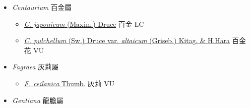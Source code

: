 
  \begin{itemize}
 \item[] \textit{Centaurium} 百金屬
                    
  \begin{itemize}
        \item[] \href{http://www.theplantlist.org/tpl1.1/search?q=Centaurium+japonicum}{\textit{C. japonicum} (Maxim.) Druce}   百金 LC
        \item[] \href{http://www.theplantlist.org/tpl1.1/search?q=Centaurium+pulchellum+var.+altaicum}{\textit{C. pulchellum} (Sw.) Druce var. \textit{altaicum} (Griseb.) Kitag. \& H.Hara}   百金花 VU
  \end{itemize}
 \item[] \textit{Fagraea} 灰莉屬
                    
  \begin{itemize}
        \item[] \href{http://www.theplantlist.org/tpl1.1/search?q=Fagraea+ceilanica}{\textit{F. ceilanica} Thumb.}   灰莉 VU
  \end{itemize}
 \item[] \textit{Gentiana} 龍膽屬
                    

\end{itemize}
